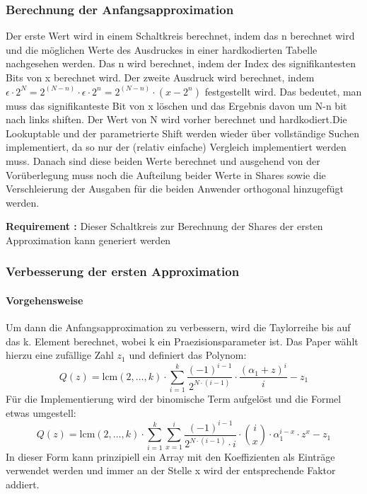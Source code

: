 \documentclass{article}
\newcounter{requirementscount}{}
\newcommand{\requirement}[1] {
        \addtocounter{requirementscount}{1}
        {\bf Requirement \therequirementscount:} #1\\
    }
\begin{document}
\subsubsection{Berechnung der Anfangsapproximation}
Der erste Wert wird in einem Schaltkreis berechnet, indem das n berechnet wird
und die m\"oglichen Werte des Ausdruckes in einer hardkodierten Tabelle
nachgesehen werden. Das n wird berechnet, indem der Index des signifikantesten
Bits von x berechnet wird. Der zweite Ausdruck wird berechnet, indem 
\(\epsilon \cdot 2^N = 2^(N-n) \cdot \epsilon \cdot 2^n = 2^(N-n) \cdot (x - 2^n)\) 
festgestellt wird. Das bedeutet, man muss das signifikanteste Bit von x 
l\"oschen und das Ergebnis davon um N-n bit nach links shiften. Der Wert
von N wird vorher berechnet und hardkodiert.Die Lookuptable und der 
parametrierte Shift werden wieder \"uber vollst\"andige Suchen implementiert,
da so nur der (relativ einfache) Vergleich implementiert werden muss.
Danach sind diese beiden Werte berechnet und ausgehend von der Vor\"uberlegung
muss noch die Aufteilung beider Werte in Shares sowie die Verschleierung der
Ausgaben f\"ur die beiden Anwender orthogonal hinzugef\"ugt werden.
\requirement{Dieser Schaltkreis zur Berechnung der Shares der
ersten Approximation kann generiert werden}

\subsubsection{Verbesserung der ersten Approximation}
\paragraph{Vorgehensweise}
Um dann die Anfangsapproximation zu verbessern, wird die Taylorreihe bis auf
das k. Element berechnet, wobei k ein Praezisionsparameter ist. Das Paper
w\"ahlt hierzu eine zuf\"allige Zahl \(z_1\) und definiert das Polynom:
\begin{equation}
Q(z) = 
    \mathrm{lcm}(2,\dots,k)
    \cdot
    \sum_{i=1}^k 
    \frac{(-1)^{i-1}}{2^{N \cdot (i-1)}}
    \cdot
    \frac{(\alpha_1+z)^i}{i}
    - z_1
\end{equation}
F\"ur die Implementierung wird der binomische Term aufgel\"ost und die Formel
etwas umgestell:
\begin{equation}
Q(z) =
    \mathrm{lcm}(2, \dots, k)
    \cdot
    \sum
        _{
            i=1
        }
        ^k
    \sum
        _{
            x=1
        }
        ^i
    \frac
        {
            (-1)
                ^{
                    i-1
                }
        }
        {
            2
                ^{
                    N \cdot (i-1)
                }
            \cdot 
            i
        }
    \cdot
    {i \choose x}
    \cdot
    \alpha_1
        ^{i-x}
    \cdot
    z
        ^x
    - z_1
\end{equation}
In dieser Form kann prinzipiell ein Array mit den Koeffizienten als Eintr\"age
verwendet werden und immer an der Stelle x wird der entsprechende Faktor
addiert.
\end{document}

